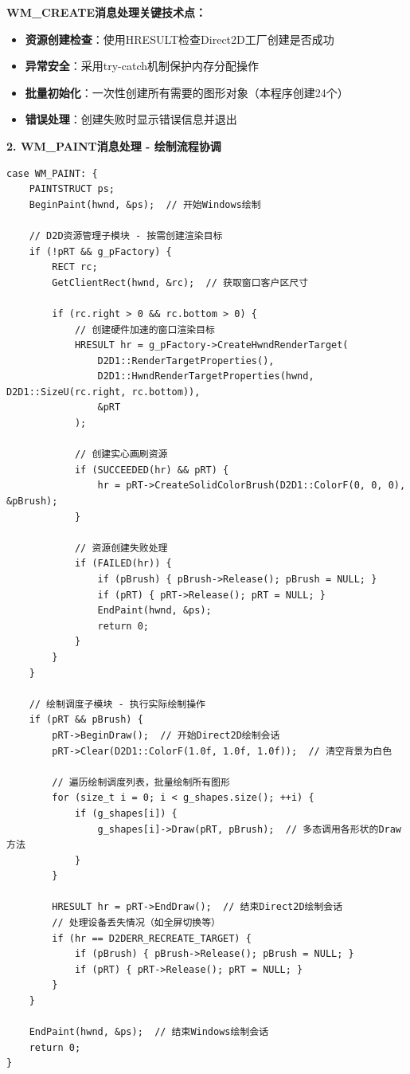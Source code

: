 \documentclass[12pt,a4paper]{article}
\begin{document}
\textbf{WM\_CREATE消息处理关键技术点：}
\begin{itemize}
    \item \textbf{资源创建检查}：使用HRESULT检查Direct2D工厂创建是否成功
    \item \textbf{异常安全}：采用try-catch机制保护内存分配操作
    \item \textbf{批量初始化}：一次性创建所有需要的图形对象（本程序创建24个）
    \item \textbf{错误处理}：创建失败时显示错误信息并退出
\end{itemize}

\textbf{2. WM\_PAINT消息处理 - 绘制流程协调}

\begin{lstlisting}[caption=绘制流程消息处理]
case WM_PAINT: {
    PAINTSTRUCT ps;
    BeginPaint(hwnd, &ps);  // 开始Windows绘制

    // D2D资源管理子模块 - 按需创建渲染目标
    if (!pRT && g_pFactory) {
        RECT rc;
        GetClientRect(hwnd, &rc);  // 获取窗口客户区尺寸
        
        if (rc.right > 0 && rc.bottom > 0) {
            // 创建硬件加速的窗口渲染目标
            HRESULT hr = g_pFactory->CreateHwndRenderTarget(
                D2D1::RenderTargetProperties(),
                D2D1::HwndRenderTargetProperties(hwnd, D2D1::SizeU(rc.right, rc.bottom)),
                &pRT
            );

            // 创建实心画刷资源
            if (SUCCEEDED(hr) && pRT) {
                hr = pRT->CreateSolidColorBrush(D2D1::ColorF(0, 0, 0), &pBrush);
            }
            
            // 资源创建失败处理
            if (FAILED(hr)) {
                if (pBrush) { pBrush->Release(); pBrush = NULL; }
                if (pRT) { pRT->Release(); pRT = NULL; }
                EndPaint(hwnd, &ps);
                return 0;
            }
        }
    }

    // 绘制调度子模块 - 执行实际绘制操作
    if (pRT && pBrush) {
        pRT->BeginDraw();  // 开始Direct2D绘制会话
        pRT->Clear(D2D1::ColorF(1.0f, 1.0f, 1.0f));  // 清空背景为白色

        // 遍历绘制调度列表，批量绘制所有图形
        for (size_t i = 0; i < g_shapes.size(); ++i) {
            if (g_shapes[i]) {
                g_shapes[i]->Draw(pRT, pBrush);  // 多态调用各形状的Draw方法
            }
        }

        HRESULT hr = pRT->EndDraw();  // 结束Direct2D绘制会话
        // 处理设备丢失情况（如全屏切换等）
        if (hr == D2DERR_RECREATE_TARGET) {
            if (pBrush) { pBrush->Release(); pBrush = NULL; }
            if (pRT) { pRT->Release(); pRT = NULL; }
        }
    }
    
    EndPaint(hwnd, &ps);  // 结束Windows绘制会话
    return 0;
}
\end{lstlisting}
\end{document}
